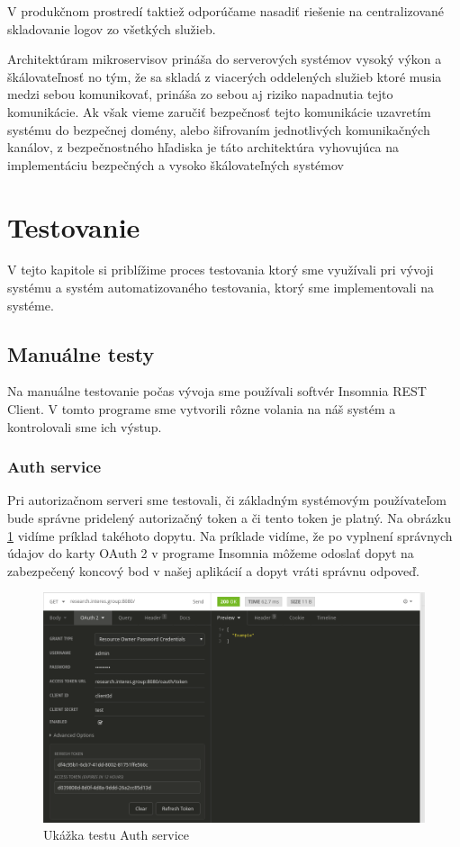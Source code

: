 V produkčnom prostredí taktiež odporúčame nasadiť riešenie na centralizované skladovanie logov zo všetkých služieb.

Architektúram mikroservisov prináša do serverových systémov vysoký výkon a škálovateľnosť no tým, že sa skladá z viacerých oddelených služieb ktoré musia medzi sebou komunikovať, prináša zo sebou aj riziko napadnutia tejto komunikácie. Ak však vieme zaručiť bezpečnosť tejto komunikácie uzavretím systému do bezpečnej domény, alebo šifrovaním jednotlivých komunikačných kanálov, z bezpečnostného hľadiska je táto architektúra vyhovujúca na  implementáciu bezpečných a vysoko škálovateľných systémov


\section{Testovanie}
V tejto kapitole si priblížime proces testovania ktorý sme využívali pri vývoji systému a systém automatizovaného testovania, ktorý sme implementovali na systéme.

\subsection{Manuálne testy}

Na manuálne testovanie počas vývoja sme používali softvér Insomnia REST Client\cite{insomnia}. V tomto programe sme vytvorili rôzne volania na náš systém a kontrolovali sme ich výstup.

\subsubsection{Auth service}
Pri autorizačnom serveri sme testovali, či základným systémovým používateľom bude správne pridelený autorizačný token a či tento token je platný. Na obrázku \ref{insomnia_oauth} vidíme príklad takéhoto dopytu. Na príklade vidíme, že po vyplnení správnych údajov do karty OAuth 2 v programe Insomnia môžeme odoslať dopyt na zabezpečený koncový bod v našej aplikácií a dopyt vráti správnu odpoveď.
\begin{figure}[!htbp]
	\centering
	\includegraphics[width=16cm]{img/insomnia_oauth.png}
	\caption{Ukážka testu Auth service}
	\label{insomnia_oauth}
\end{figure}

